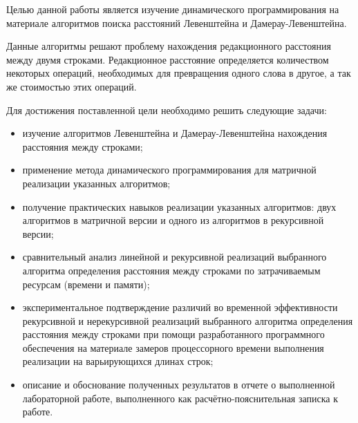 \Introduction

Целью данной работы является изучение динамического программирования на материале алгоритмов поиска расстояний Левенштейна и Дамерау-Левенштейна.

Данные алгоритмы решают проблему нахождения редакционного расстояния между двумя строками. Редакционное расстояние определяется количеством некоторых операций, необходимых для превращения одного слова в другое, а так же стоимостью этих операций.

Для достижения поставленной цели необходимо решить следующие задачи:

\begin{itemize}
    \item изучение алгоритмов Левенштейна и Дамерау-Левенштейна нахождения расстояния между строками;
    \item применение метода динамического программирования для матричной реализации указанных алгоритмов;
    \item получение практических навыков реализации указанных алгоритмов: двух алгоритмов в матричной версии и одного из алгоритмов в рекурсивной версии;
    \item сравнительный анализ линейной и рекурсивной реализаций выбранного алгоритма определения расстояния между строками по затрачиваемым ресурсам (времени и памяти);
    \item экспериментальное подтверждение различий во временной эффективности рекурсивной и нерекурсивной реализаций выбранного алгоритма определения расстояния между строками при помощи разработанного программного обеспечения на материале замеров процессорного времени выполнения реализации на варьирующихся длинах строк;
    \item описание и обоснование полученных результатов в отчете о выполненной лабораторной работе, выполненного как расчётно-пояснительная записка к работе.
\end{itemize}

